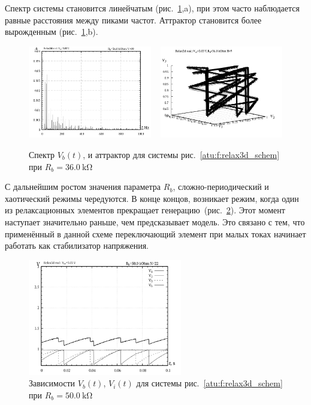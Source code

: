 Спектр системы становится линейчатым (рис.~\ref{atu:f:relax3d_f_09},a), при этом
часто наблюдается равные расстояния между пиками частот.
Аттрактор становится более вырожденным (рис.~\ref{atu:f:relax3d_f_09},b).

\begin{figure}[htb!]
  \centerline{
    \includegraphics[width=0.48\textwidth]{p/relax3d_f_09.png}
    ~
    \includegraphics[width=0.48\textwidth]{p/relax3d_v1v2v3_09.png}
  }
  \caption{Спектр $V_b(t)$, и аттрактор для системы рис.~\ref{atu:f:relax3d_schem} при $R_b=\SI{36.0}{\kilo\ohm}$ }
  \label{atu:f:relax3d_f_09}
\end{figure}

С дальнейшим ростом значения параметра $R_b$, сложно-периодический и хаотический
режимы чередуются. В конце концов, возникает режим, когда
один из релаксационных элементов прекращает генерацию~(рис.~\ref{atu:f:relax3d_t_22}).
Этот момент наступает значительно раньше, чем предсказывает
модель. Это связано с тем, что применённый в данной схеме переключающий элемент
при малых токах начинает работать как стабилизатор напряжения.

\begin{figure}[htb!]
  \centerline{\includegraphics[width=0.6\textwidth]{p/relax3d_t_22.png} }
  \caption{Зависимости $V_b(t)$, $V_i(t)$ для системы рис.~\ref{atu:f:relax3d_schem} при $R_b=\SI{50.0}{\kilo\ohm}$ }
  \label{atu:f:relax3d_t_22}
\end{figure}

